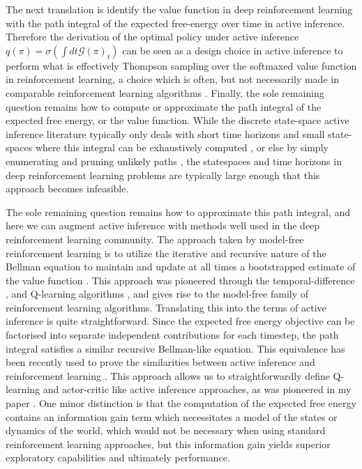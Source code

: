 The next translation is identify the value function in deep reinforcement learning with the path integral of the expected free-energy over time in active inference. Therefore the derivation of the optimal policy under active inference $q(\pi) = \sigma(\int dt \mathcal{G}(\pi)_t)$ can be seen as a design choice in active inference to perform what is effectively Thompson sampling over the softmaxed value function in reinforcement learning, a choice which is often, but not necessarily made in comparable reinforcement learning algorithms \citep{osband2015bootstrapped}. Finally, the sole remaining question remains how to compute or approximate the path integral of the expected free energy, or the value function. While the discrete state-space active inference literature typically only deals with short time horizons and small state-spaces where this integral can be exhaustively computed \citep{da2020active}, or else by simply enumerating and pruning unlikely paths \citep{friston2020sophisticated}, the statespaces and time horizons in deep reinforcement learning problems are typically large enough that this approach becomes infeasible. 

The sole remaining question remains how to approximate this path integral, and here we can augment active inference with methods well used in the deep reinforcement learning community. The approach taken by model-free reinforcement learning is to utilize the iterative and recursive nature of the Bellman equation to maintain and update at all times a bootstrapped estimate of the value function \citep{kaelbling1996reinforcement,mnih2013playing}. This approach was pioneered through the temporal-difference \citep{sutton1988learning}, and Q-learning algorithms \citep{watkins1992q}, and gives rise to the model-free family of reinforcement learning algorithms. Translating this into the terms of active inference is quite straightforward. Since the expected free energy objective can be factorised into separate independent contributions for each timestep, the path integral satisfies a similar recursive Bellman-like equation. This equivalence has been recently used to prove the similarities between active inference and reinforcement learning \citep{da2020relationship}. This approach allows us to straightforwardly define Q-learning and actor-critic like active inference approaches, as was pioneered in my paper \citep{millidge2019deep}. One minor distinction is that the computation of the expected free energy contains an information gain term which necessitates a model of the states or dynamics of the world, which would not be necessary when using standard reinforcement learning approaches, but this information gain yields superior exploratory capabilities and ultimately performance.

